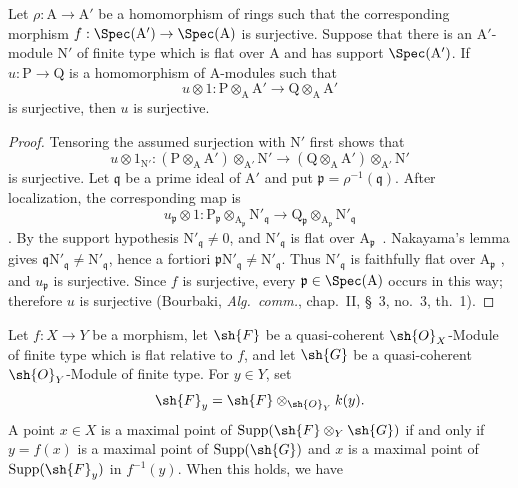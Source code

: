 \begin{lemma}[2.5.4.1]
\label{IV.2.5.4.1}
Let $\rho:\mathrm{A}\to\mathrm{A}'$ be a homomorphism of rings such that
the corresponding morphism
$f:\Spec(\mathrm{A}')\to\Spec(\mathrm{A})$ is surjective. Suppose that
there is an $\mathrm{A}'$-module $\mathrm{N}'$ of finite type which is
flat over $\mathrm{A}$ and has support $\Spec(\mathrm{A}')$. If
$u:\mathrm{P}\to\mathrm{Q}$ is a homomorphism of $\mathrm{A}$-modules
such that
\[
  u\otimes 1:
  \mathrm{P}\otimes_{\mathrm{A}}\mathrm{A}'
  \longrightarrow
  \mathrm{Q}\otimes_{\mathrm{A}}\mathrm{A}'
\]
is surjective, then $u$ is surjective.
\end{lemma}

\begin{proof}
Tensoring the assumed surjection with $\mathrm{N}'$ first shows that
\[
  u\otimes 1_{\mathrm{N}'}:
  (\mathrm{P}\otimes_{\mathrm{A}}\mathrm{A}')
    \otimes_{\mathrm{A}'}\mathrm{N}'
  \longrightarrow
  (\mathrm{Q}\otimes_{\mathrm{A}}\mathrm{A}')
    \otimes_{\mathrm{A}'}\mathrm{N}'
\]
is surjective. Let $\mathfrak{q}$ be a prime ideal of $\mathrm{A}'$ and
put $\mathfrak{p}=\rho^{-1}(\mathfrak{q})$. After localization, the
corresponding map is
\[
  u_{\mathfrak{p}}\otimes 1:
  \mathrm{P}_{\mathfrak{p}}
    \otimes_{\mathrm{A}_{\mathfrak{p}}}\mathrm{N}'_{\mathfrak{q}}
  \longrightarrow
  \mathrm{Q}_{\mathfrak{p}}
    \otimes_{\mathrm{A}_{\mathfrak{p}}}\mathrm{N}'_{\mathfrak{q}}
\]
. By the support hypothesis
$\mathrm{N}'_{\mathfrak{q}}\neq0$, and
$\mathrm{N}'_{\mathfrak{q}}$ is flat over
$\mathrm{A}_{\mathfrak{p}}$~. Nakayama's lemma gives
$\mathfrak{q}\mathrm{N}'_{\mathfrak{q}}\neq
\mathrm{N}'_{\mathfrak{q}}$, hence a fortiori
$\mathfrak{p}\mathrm{N}'_{\mathfrak{q}}\neq
\mathrm{N}'_{\mathfrak{q}}$. Thus $\mathrm{N}'_{\mathfrak{q}}$ is
faithfully flat over $\mathrm{A}_{\mathfrak{p}}$
, and $u_{\mathfrak{p}}$ is surjective. Since $f$ is
surjective, every $\mathfrak{p}\in\Spec(\mathrm{A})$ occurs in this way;
therefore $u$ is surjective (Bourbaki, \emph{Alg.\ comm.}, chap.~II,
\S~3, no.~3, th.~1).
\end{proof}

\begin{proposition}[2.5.5]
\label{IV.2.5.5}
Let $f:X\to Y$ be a morphism, let $\sh{F}$ be a quasi-coherent
$\sh{O}_X$-Module of finite type which is flat relative to $f$, and let
$\sh{G}$ be a quasi-coherent $\sh{O}_Y$-Module of finite type. For
$y\in Y$, set
\[
  \sh{F}_y=\sh{F}\otimes_{\sh{O}_Y}k(y).
\]
A point $x\in X$ is a maximal point of
$\operatorname{Supp}(\sh{F}\otimes_Y\sh{G})$ if and only if
$y=f(x)$ is a maximal point of $\operatorname{Supp}(\sh{G})$ and $x$
is a maximal point of $\operatorname{Supp}(\sh{F}_y)$ in $f^{-1}(y)$.
When this holds, we have
\end{proposition}

